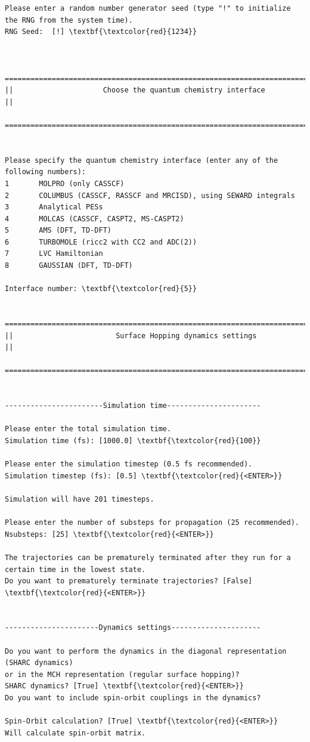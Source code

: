 \documentclass[a4paper,11pt,DIV=15,openany]{scrbook}
\begin{document}
\begin{oframed}
\begin{Verbatim}[commandchars=\\\{\}]
Please enter a random number generator seed (type "!" to initialize the RNG from the system time).
RNG Seed:  [!] \textbf{\textcolor{red}{1234}}


  ================================================================================
||                     Choose the quantum chemistry interface                     ||
  ================================================================================


Please specify the quantum chemistry interface (enter any of the following numbers):
1       MOLPRO (only CASSCF)
2       COLUMBUS (CASSCF, RASSCF and MRCISD), using SEWARD integrals
3       Analytical PESs
4       MOLCAS (CASSCF, CASPT2, MS-CASPT2)
5       AMS (DFT, TD-DFT)
6       TURBOMOLE (ricc2 with CC2 and ADC(2))
7       LVC Hamiltonian
8       GAUSSIAN (DFT, TD-DFT)

Interface number: \textbf{\textcolor{red}{5}}

  ================================================================================
||                        Surface Hopping dynamics settings                       ||
  ================================================================================


-----------------------Simulation time----------------------

Please enter the total simulation time.
Simulation time (fs): [1000.0] \textbf{\textcolor{red}{100}}

Please enter the simulation timestep (0.5 fs recommended).
Simulation timestep (fs): [0.5] \textbf{\textcolor{red}{<ENTER>}}

Simulation will have 201 timesteps.

Please enter the number of substeps for propagation (25 recommended).
Nsubsteps: [25] \textbf{\textcolor{red}{<ENTER>}}

The trajectories can be prematurely terminated after they run for a certain time in the lowest state. 
Do you want to prematurely terminate trajectories? [False] \textbf{\textcolor{red}{<ENTER>}}


----------------------Dynamics settings---------------------

Do you want to perform the dynamics in the diagonal representation (SHARC dynamics) 
or in the MCH representation (regular surface hopping)?
SHARC dynamics? [True] \textbf{\textcolor{red}{<ENTER>}}
Do you want to include spin-orbit couplings in the dynamics?

Spin-Orbit calculation? [True] \textbf{\textcolor{red}{<ENTER>}}
Will calculate spin-orbit matrix.



\end{Verbatim}
\end{oframed}
\end{document}
